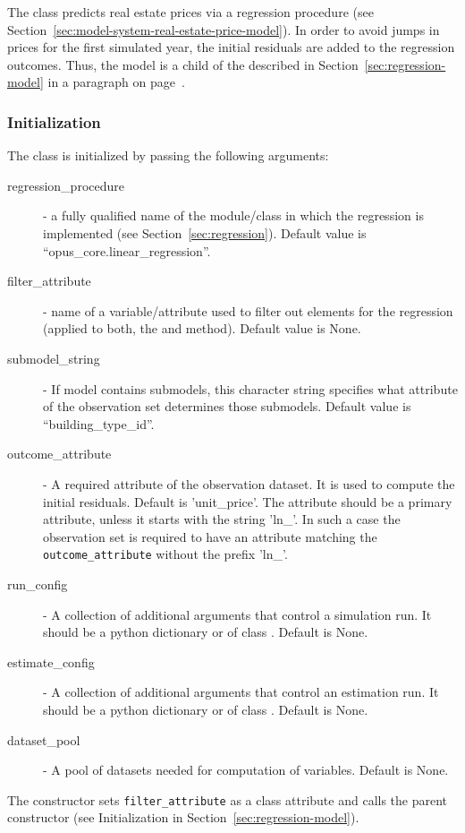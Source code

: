 The  
class predicts real estate prices via a regression procedure (see Section~\ref{sec:model-system-real-estate-price-model}).
In order to avoid jumps in prices for the first simulated year, the initial residuals are 
added to the regression outcomes. Thus,
the model is a child of the   
described in
Section~\ref{sec:regression-model} in a paragraph on page~\pageref{page:regression-model-with-initial-residuals}.

\subsubsection{Initialization}
%
The class is initialized by passing the following arguments:
\begin{description}
\item[regression_procedure] - a fully qualified name of the module/class in
  which the regression is implemented (see
  Section~\ref{sec:regression}). Default value is
  ``opus_core.linear_regression''.
\item[filter_attribute] - name of a variable/attribute used to filter out elements for
  the regression (applied to both, the  and 
  method). Default value is None.
\item[submodel_string] - If model contains submodels, this character string
  specifies what attribute of the observation set determines those
  submodels. Default value is ``building_type_id''.
\item[outcome_attribute] - A required attribute of the observation dataset. It is used to compute the 
initial residuals. Default is 'unit_price'. The attribute should be a primary attribute, unless 
it starts with the string 'ln_'. In such a case the observation set is required to have an attribute 
matching the \verb|outcome_attribute| without the prefix 'ln_'. 
\item[run_config] - A collection of additional arguments that control a
  simulation run. It should be a python dictionary or of class . Default is None.
\item[estimate_config] - A collection of additional arguments that control an
  estimation run. It should be a python dictionary or of class . Default is None.
  \item[dataset_pool] - A pool of datasets needed for computation of variables. Default is None.
\end{description}
The constructor sets \verb|filter_attribute| as a class attribute and calls the parent
constructor (see Initialization in Section~\ref{sec:regression-model}).

